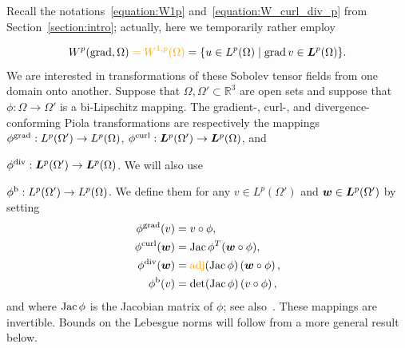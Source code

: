 \documentclass[10pt,letterpaper]{article}
\newcommand\cye[1]{%
  \protect\leavevmode
  \begingroup
    \color{red!35!yellow}%
    #1%
  \endgroup
}
\begin{document}
\cye{Recall the notations~\eqref{equation:W1p} and~\eqref{equation:W_curl_div_p} from Section~\ref{section:intro}; actually, here we temporarily rather employ }
\begin{gather*}
    W^{p}(\grad,\Omega) \cye{= W^{1,p}(\Omega)} = \{ u \in L^{p}(\Omega) \suchthat \grad v \in \bfL^{p}(\Omega) \}
    .
\end{gather*}
We are interested in transformations of these Sobolev tensor fields from one domain onto another. 
Suppose that $\Omega, \Omega' \subset \mathbb{R}^3$ are open sets and suppose that $\phi: \Omega \to \Omega'$ is a bi-Lipschitz mapping.
The gradient-, curl-, \cye{and} divergence-conforming Piola transformations are \cye{respectively} the mappings 
$\phi^{\operatorname{grad}}: L^{p}(\Omega') \to L^{p}(\Omega)$,
$\phi^{\operatorname{curl}}: \bm{L}^{p}(\Omega') \to \bm{L}^{p}(\Omega)$, \cye{and} 
$\phi^{\operatorname{div}}: \bm{L}^{p}(\Omega') \to \bm{L}^{p}(\Omega)$.
\cye{We will also use}
$\phi^{\rm b}: L^{p}(\Omega') \to L^{p}(\Omega)$. 
We define them 
for any $v \in L^{p}(\Omega')$ and $\bm{w} \in \bm{L}^{p}(\Omega')$ by setting 
\begin{subequations}\label{eq_definition_piola}
\begin{align*}
    \phi^{\grad}(v) &= v \circ \phi, \\
    \phi^{\curl}(\bfw) &= \Jacobian\phi^{T} (\bfw \circ \phi), \\
    \phi^{\divergence}(\bfw) &= \cye{\adj}(\Jacobian\phi) \left( \bfw \circ \phi \right), \\  
    \phi^{\rm b}(v) &= \det(\Jacobian\phi) \left( v \circ \phi \right),
\end{align*}
\end{subequations}
and where $\operatorname{{\rm Jac}}\phi$ is the Jacobian matrix of $\phi$; see also~\cite[Definition~9.8]{ern2021finite}.
These mappings are invertible. 
Bounds on the Lebesgue norms will follow from a more general result below. 
\end{document}
